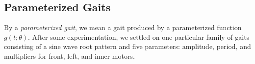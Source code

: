 \subsection{Parameterized Gaits}

\newcommand{\vv}[1]{{#1}}


By a \emph{parameterized gait}, we mean a gait produced by a
parameterized function $g(t; \vv{\theta})$.
After some experimentation, we settled on one particular family of
gaits consisting of a sine wave root pattern and five parameters:
amplitude, period, and multipliers for front, left, and inner
motors.





